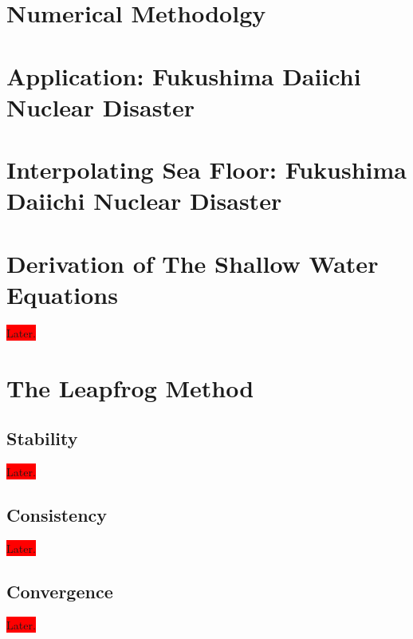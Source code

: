 \documentclass[12pt,a4]{article}
\begin{document}
\section{Numerical Methodolgy}


\section{Application: Fukushima Daiichi Nuclear Disaster}


\section{Interpolating Sea Floor: Fukushima Daiichi Nuclear Disaster}


\appendix
\section{Derivation of The Shallow Water Equations}\label{a:deriv}
\colorbox{red}{Later.}
\section{The Leapfrog Method}
\subsection{Stability}
\colorbox{red}{Later.}
\subsection{Consistency}
\colorbox{red}{Later.}
\subsection{Convergence}
\colorbox{red}{Later.}
\end{document}
